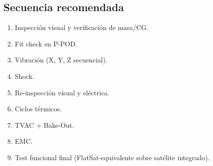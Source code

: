 \subsection{Secuencia recomendada}
\begin{enumerate}
    \item Inspección visual y verificación de masa/CG.
    \item Fit check en P-POD.
    \item Vibración (X, Y, Z secuencial).
    \item Shock.
    \item Re-inspección visual y eléctrica.
    \item Ciclos térmicos.
    \item TVAC + Bake-Out.
    \item EMC.
    \item Test funcional final (FlatSat-equivalente sobre satélite integrado).
\end{enumerate}
